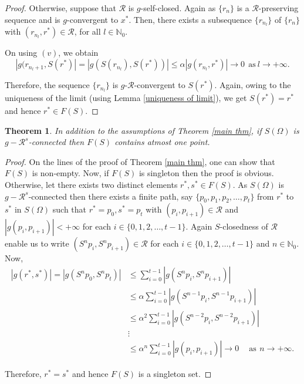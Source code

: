 \documentclass[10pt, reqno]{amsart}
\newtheorem{theorem}{Theorem}[section]
\theoremstyle{definition}
\theoremstyle{remark}
\numberwithin{equation}{section}
\begin{document}
\begin{proof}
	Otherwise, suppose that $\mathcal{R}$ is $g$-self-closed.  Again as $\{r_n\}$ is a $\mathcal{R}$-preserving sequence and is $g$-convergent to $x^*$. Then, there exists a subsequence $ \{ r_ {n_l} \} $ of $\{r_n\}$  with $ ( r_{n_l}, r^* ) \in\mathcal{R}$, for all $l\in\mathbb {N}_0$.
    
	On using   $(v)$, we obtain
	\begin{equation*}
	|g( r_{{n_l}+1}, S (r^*)| = |g( S (r_{n_l}), S (r^*))|\leq \alpha |g(r_{{n}_l}, r^*)|\to 0~ ~ \text{as}~ l\to+\infty. 
	\end{equation*}	
    
	Therefore, the sequence $ \{ r_{n_l} \}$ is $g$-$\mathcal{R}$-convergent to $ S (r^*)$. Again, owing to the uniqueness of the limit (using Lemma \ref{uniqueness of limit}), we get $ S (r^*)=r^*$ and hence $r^* \in F ( S ) $.  
\end{proof}
%

\begin{theorem}\label{m2}
	In addition to the assumptions of Theorem \ref{main thm}, if $ S ( \Omega )$ is $g-\mathcal{R}^s$-connected then   $ F ( S )  $ contains atmost one   point.
\end{theorem}
\begin{proof}
	On the lines of the proof of Theorem \ref{main thm}, one can show that $F( S )$ is non-empty. Now, if $F( S )$ is singleton then the proof is obvious. Otherwise, let there exists two distinct elements $ r^*, s ^*\in F(S )$. 
    As $ S (\Omega )$ is $g-\mathcal{R}^s$-connected then there exists a finite path, say $\{p_0,p_1,p_2,\ldots,p_t \}$ from $ r^*$ to $ s^*$ in $ S ( \Omega )$ such that $ r^*=p_0, s^*=p_t $ with $ ( p_i, p_{i+1} ) \in \mathcal{R}$ and $|g(p_i,p_{i+1})|<+\infty$  for each $i\in\{0,1,2,\ldots, t-1\}$.
	Again  $ S $-closedness of $\mathcal{R}$   enable us to write $ ( S^np_i, S^np_{i+1} ) \in \mathcal{R} $ for each $i \in \{0,1,2,\ldots,t-1\}$ and $n\in\mathbb{N}_0.$ Now, 
	\begin{align*}
		|g( r^*, s^*)|=|g( S^np_0, S^np_t)| & \leq  \sum_{i=0}^{t-1} |g( S^np_i, S^np_{i+1})| \\
		& \leq   \alpha \sum_{i=0}^{t-1} |g( S^{n-1}p_i, S^{n-1}p_{i+1})|\\
		& \leq  \alpha^2 \sum_{i=0}^{t-1} |g( S^{n-2}p_i, S^{n-2}p_{i+1})| \\
		  & \vdots \\
		 & \leq   \alpha^n \sum_{i=0}^{t-1} |g(p_i,p_{i+1})| 	\to 0 ~ \quad  \text{as}~ \, n\to+\infty. 
	\end{align*}	
    
Therefore, $ r^*= s^*$ and hence $ F ( S )  $ is a singleton set. 
\end{proof}
\end{document}
